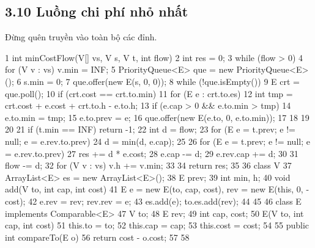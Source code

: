 \documentclass[11pt]{article}
\begin{document}
\subsection{3.10 Luồng chi phí nhỏ nhất}
\begin{NoteBlock}
Đừng quên truyền vào toàn bộ các đỉnh.
\end{NoteBlock}
\begin{Code}
1 int minCostFlow(V[] vs, V s, V t, int flow) {
2 int res = 0;
3 while (flow > 0) {
4 for (V v : vs) v.min = INF;
5 PriorityQueue<E> que = new PriorityQueue<E>();
6 s.min = 0;
7 que.offer(new E(s, 0, 0));
8 while (!que.isEmpty()) {
9 E crt = que.poll();
10 if (crt.cost == crt.to.min) {
11 for (E e : crt.to.es) {
12 int tmp = crt.cost + e.cost + crt.to.h - e.to.h;
13 if (e.cap > 0 && e.to.min > tmp) {
14 e.to.min = tmp;
15 e.to.prev = e;
16 que.offer(new E(e.to, 0, e.to.min));
17 }
18 }
19 }
20 }
21 if (t.min == INF) return -1;
22 int d = flow;
23 for (E e = t.prev; e != null; e = e.rev.to.prev) {
24 d = min(d, e.cap);
25 }
26 for (E e = t.prev; e != null; e = e.rev.to.prev) {
27 res += d * e.cost;
28 e.cap -= d;
29 e.rev.cap += d;
30 }
31 flow -= d;
32 for (V v : vs) v.h += v.min;
33 }
34 return res;
35 }
36 class V {
37 ArrayList<E> es = new ArrayList<E>();
38 E prev;
39 int min, h;
40 void add(V to, int cap, int cost) {
41 E e = new E(to, cap, cost), rev = new E(this, 0, -cost);
42 e.rev = rev; rev.rev = e;
43 es.add(e); to.es.add(rev);
44 }
45 }
46 class E implements Comparable<E> {
47 V to;
48 E rev;
49 int cap, cost;
50 E(V to, int cap, int cost) {
51 this.to = to;
52 this.cap = cap;
53 this.cost = cost;
54 }
55 public int compareTo(E o) {
56 return cost - o.cost;
57 }
58 }
\end{Code}
\end{document}
